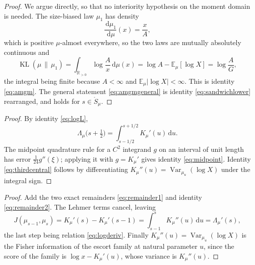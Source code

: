 \documentclass[sn-mathphys-num]{sn-jnl}
\theoremstyle{thmstyleone}%
\theoremstyle{thmstyletwo}%
\theoremstyle{thmstylethree}%
\theoremstyle{thmstyleone}%
\providecommand{\E}{\mathbb{E}}
\providecommand{\Var}{\operatorname{Var}}
\providecommand{\KL}{\operatorname{KL}}
\providecommand{\Rpos}{\mathbb{R}_{>0}}
\providecommand{\dd}{\,\mathrm{d}}
\begin{document}
\begin{appendices}
		\begin{proof}
			We argue directly, so that no interiority hypothesis on the
			moment domain is needed. The size-biased law $\mu_1$ has density
			\begin{equation}\label{eq:sizebiased}
				\frac{\dd\mu_1}{\dd\mu}(x)=\frac{x}{A},
			\end{equation}
			which is positive $\mu$-almost everywhere, so the two laws are
			mutually absolutely continuous and
			\begin{equation}\label{eq:amgmproof}
				\KL(\mu\,\|\,\mu_1)
				=\int_{\Rpos}\log\frac{A}{x}\dd\mu(x)
				=\log A-\E_\mu[\log X]
				=\log\frac AG ,
			\end{equation}
			the integral being finite because $A<\infty$ and
			$\E_\mu|\log X|<\infty$. This is identity \eqref{eq:amgm}. The
			general statement \eqref{eq:amgmgeneral} is identity
			\eqref{eq:sandwichlower} rearranged, and holds for
			$s\in\mathring S_\mu$.
		\end{proof}
		
		\lemmidpoint*
		
		\begin{proof}
			By identity \eqref{eq:logL},
			\begin{equation}\label{eq:midint}
				\Lambda_\mu\bigl(s+\tfrac12\bigr)
				=\int_{s-1/2}^{s+1/2}K_\mu'(u)\dd u .
			\end{equation}
			The midpoint quadrature rule for a $C^2$ integrand $g$ on an
			interval of unit length has error $\tfrac1{24}g''(\xi)$; applying
			it with $g=K_\mu'$ gives identity \eqref{eq:midpoint}. Identity
			\eqref{eq:thirdcentral} follows by differentiating
			$K_\mu''(u)=\Var_{\mu_u}(\log X)$ under the integral sign.
		\end{proof}
		
		\thmjeffreys*
		
		\begin{proof}
			Add the two exact remainders \eqref{eq:remainder1} and
			identity \eqref{eq:remainder2}. The Lehmer terms cancel, leaving
			\begin{equation}\label{eq:jeffreysproof}
				J(\mu_{s-1},\mu_s)
				=K_\mu'(s)-K_\mu'(s-1)
				=\int_{s-1}^{s}K_\mu''(u)\dd u
				=\Lambda_\mu'(s),
			\end{equation}
			the last step being relation \eqref{eq:logderiv}. Finally
			$K_\mu''(u)=\Var_{\mu_u}(\log X)$ is the Fisher information of the
			escort family at natural parameter $u$, since the score of the
			family is $\log x-K_\mu'(u)$, whose variance is $K_\mu''(u)$.
		\end{proof}
		

\end{appendices}
\end{document}
